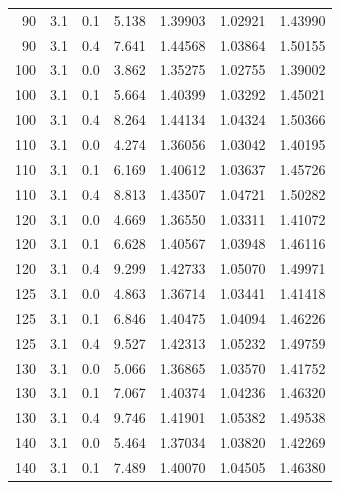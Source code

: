 \begin{longtable}{rrrrrrr}
\num{90} & \num{3.1} & \num{0.1} & \num{5.138} & \num{1.39903} & \num{1.02921} & \num{1.43990}\\
\num{90} & \num{3.1} & \num{0.4} & \num{7.641} & \num{1.44568} & \num{1.03864} & \num{1.50155}\\
\num{100} & \num{3.1} & \num{0.0} & \num{3.862} & \num{1.35275} & \num{1.02755} & \num{1.39002}\\
\num{100} & \num{3.1} & \num{0.1} & \num{5.664} & \num{1.40399} & \num{1.03292} & \num{1.45021}\\
\num{100} & \num{3.1} & \num{0.4} & \num{8.264} & \num{1.44134} & \num{1.04324} & \num{1.50366}\\
\num{110} & \num{3.1} & \num{0.0} & \num{4.274} & \num{1.36056} & \num{1.03042} & \num{1.40195}\\
\num{110} & \num{3.1} & \num{0.1} & \num{6.169} & \num{1.40612} & \num{1.03637} & \num{1.45726}\\
\num{110} & \num{3.1} & \num{0.4} & \num{8.813} & \num{1.43507} & \num{1.04721} & \num{1.50282}\\
\num{120} & \num{3.1} & \num{0.0} & \num{4.669} & \num{1.36550} & \num{1.03311} & \num{1.41072}\\
\num{120} & \num{3.1} & \num{0.1} & \num{6.628} & \num{1.40567} & \num{1.03948} & \num{1.46116}\\
\num{120} & \num{3.1} & \num{0.4} & \num{9.299} & \num{1.42733} & \num{1.05070} & \num{1.49971}\\
\num{125} & \num{3.1} & \num{0.0} & \num{4.863} & \num{1.36714} & \num{1.03441} & \num{1.41418}\\
\num{125} & \num{3.1} & \num{0.1} & \num{6.846} & \num{1.40475} & \num{1.04094} & \num{1.46226}\\
\num{125} & \num{3.1} & \num{0.4} & \num{9.527} & \num{1.42313} & \num{1.05232} & \num{1.49759}\\
\num{130} & \num{3.1} & \num{0.0} & \num{5.066} & \num{1.36865} & \num{1.03570} & \num{1.41752}\\
\num{130} & \num{3.1} & \num{0.1} & \num{7.067} & \num{1.40374} & \num{1.04236} & \num{1.46320}\\
\num{130} & \num{3.1} & \num{0.4} & \num{9.746} & \num{1.41901} & \num{1.05382} & \num{1.49538}\\
\num{140} & \num{3.1} & \num{0.0} & \num{5.464} & \num{1.37034} & \num{1.03820} & \num{1.42269}\\
\num{140} & \num{3.1} & \num{0.1} & \num{7.489} & \num{1.40070} & \num{1.04505} & \num{1.46380}\\

\end{longtable}

